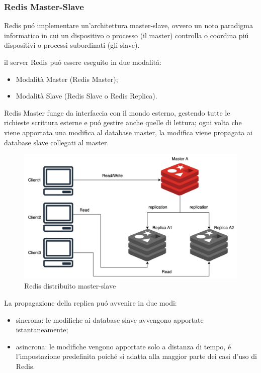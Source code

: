 \subsubsection{Redis Master-Slave}
Redis puó implementare un'architettura master-slave, ovvero un noto paradigma informatico in cui un dispositivo o processo (il master)
controlla o coordina piú dispositivi o processi subordinati (gli slave).

il server Redis puó essere eseguito in due modalitá:
\begin{itemize}
    \item Modalità Master (Redis Master);
    \item Modalità Slave (Redis Slave o Redis Replica).
\end{itemize}


Redis Master funge da interfaccia con il mondo esterno, gestendo tutte le richieste scrittura esterne e puó gestire anche
quelle di lettura;
ogni volta che viene apportata una modifica al database master, la modifica viene propagata ai database slave collegati al master.\\

\begin{figure}[H]
\includegraphics[width=1\textwidth]{img/masterslaveRedis}
\caption{Redis distribuito master-slave}
\end{figure}

La propagazione della replica puó avvenire in due modi:
\begin{itemize}
    \item sincrona: le modifiche ai database slave avvengono apportate istantaneamente;
    \item asincrona: le modifiche vengono apportate solo a distanza di tempo, é l'impostazione predefinita poiché si adatta
    alla maggior parte dei casi d'uso di Redis.
\end{itemize}

